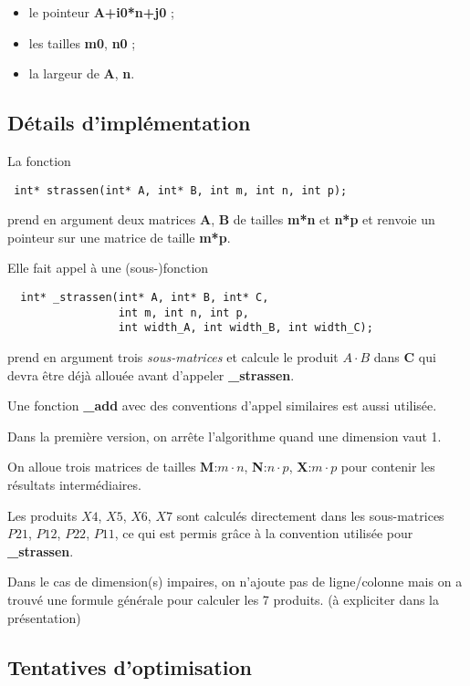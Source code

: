 \documentclass[a4paper]{article}
\begin{document}
\begin{itemize}
  \item le pointeur {\bf A+i0*n+j0} ;
  \item les tailles {\bf m0}, {\bf n0} ;
  \item la largeur de {\bf A}, {\bf n}.
\end{itemize}

\subsection{Détails d'implémentation}

La fonction

\begin{verbatim}
 int* strassen(int* A, int* B, int m, int n, int p);
\end{verbatim}

prend en argument deux matrices {\bf A}, {\bf B} de tailles {\bf m*n} et
{\bf n*p} et renvoie un pointeur sur une matrice de taille {\bf m*p}.

Elle fait appel à une (sous-)fonction

\begin{verbatim}
  int* _strassen(int* A, int* B, int* C,
                 int m, int n, int p,
                 int width_A, int width_B, int width_C);
\end{verbatim}

prend en argument trois {\it sous-matrices} et calcule le produit
$A \cdot B$ dans {\bf C} qui devra être déjà allouée avant d'appeler
{\bf \_strassen}.

Une fonction {\bf \_add} avec des conventions d'appel similaires
est aussi utilisée.

Dans la première version, on arrête l'algorithme quand une dimension
vaut 1.

On alloue trois matrices de tailles {\bf M}:$m \cdot n$,
{\bf N}:$n \cdot p$, {\bf X}:$m \cdot p$
pour contenir les résultats intermédiaires.

Les produits $X4$, $X5$, $X6$, $X7$ sont calculés directement dans les
sous-matrices $P21$, $P12$, $P22$, $P11$, ce qui est permis grâce
à la convention utilisée pour {\bf \_strassen}.

Dans le cas de dimension(s) impaires, on n'ajoute pas de ligne/colonne
mais on a trouvé une formule générale pour calculer les 7 produits.
(à expliciter dans la présentation)

\subsection{Tentatives d'optimisation}
\end{document}

